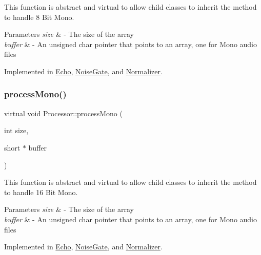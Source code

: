 This function is abstract and virtual to allow child classes to inherit the method to handle 8 Bit Mono. 
\begin{DoxyParams}{Parameters}
{\em size} & -\/ The size of the array \\
\hline
{\em buffer} & -\/ An unsigned char pointer that points to an array, one for Mono audio files \\
\hline
\end{DoxyParams}


Implemented in \hyperlink{classEcho_aa986059869416324c246a403e09c584d}{Echo}, \hyperlink{classNoiseGate_ae8fd94876fcfe26528fb62df850f92f9}{Noise\+Gate}, and \hyperlink{classNormalizer_a6063bdca1769d4f5dca7d76272344a03}{Normalizer}.

\mbox{\label{classProcessor_ab24fa87b5eb6246cf8599756b3b5862d}} 
\subsubsection{\texorpdfstring{process\+Mono()}{processMono()}\hspace{0.1cm}{\footnotesize\ttfamily [2/2]}}
{\footnotesize\ttfamily virtual void Processor\+::process\+Mono (\begin{DoxyParamCaption}\item[{int}]{size,  }\item[{short $\ast$}]{buffer }\end{DoxyParamCaption})\hspace{0.3cm}{\ttfamily [pure virtual]}}

This function is abstract and virtual to allow child classes to inherit the method to handle 16 Bit Mono. 
\begin{DoxyParams}{Parameters}
{\em size} & -\/ The size of the array \\
\hline
{\em buffer} & -\/ An unsigned char pointer that points to an array, one for Mono audio files \\
\hline
\end{DoxyParams}


Implemented in \hyperlink{classEcho_af5155cf6165be0317de49e4498268062}{Echo}, \hyperlink{classNoiseGate_a8cb287300db269efcb8130a9f21d205b}{Noise\+Gate}, and \hyperlink{classNormalizer_aa997755adc989a2b6610cfd944824bdc}{Normalizer}.

\mbox{\label{classProcessor_a9b3db1d1810308706285c3ffd1f6d28c}} 
